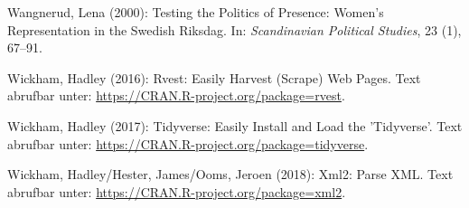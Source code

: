 \documentclass[oneside, 12pt]{scrbook}
\theoremstyle{definition}
\theoremstyle{definition}
\theoremstyle{definition}
\theoremstyle{remark}
\begin{document}
\leavevmode\hypertarget{ref-wangnerud_2000}{}%
Wangnerud, Lena (2000): Testing the Politics of Presence: Women's
Representation in the Swedish Riksdag. In: \emph{Scandinavian Political
Studies}, 23 (1), 67--91.

\leavevmode\hypertarget{ref-wickham_2016}{}%
Wickham, Hadley (2016): Rvest: Easily Harvest (Scrape) Web Pages. Text
abrufbar unter: \url{https://CRAN.R-project.org/package=rvest}.

\leavevmode\hypertarget{ref-wickham_2017}{}%
Wickham, Hadley (2017): Tidyverse: Easily Install and Load the
'Tidyverse'. Text abrufbar unter:
\url{https://CRAN.R-project.org/package=tidyverse}.

\leavevmode\hypertarget{ref-wickham_2018}{}%
Wickham, Hadley/Hester, James/Ooms, Jeroen (2018): Xml2: Parse XML. Text
abrufbar unter: \url{https://CRAN.R-project.org/package=xml2}.
\end{document}
